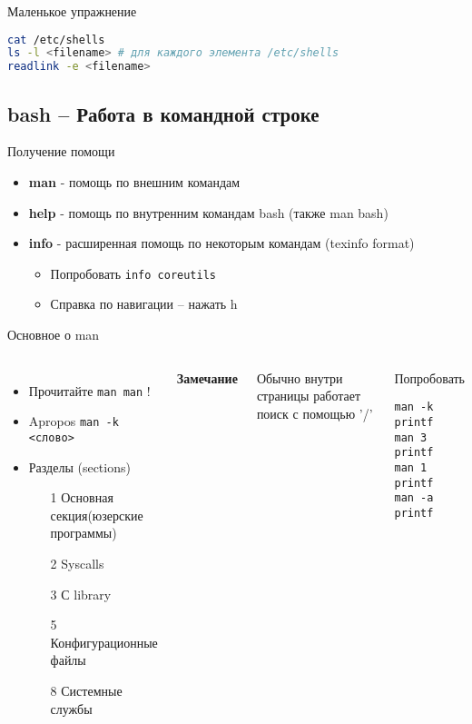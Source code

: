 \documentclass[ignorenonframetext, professionalfonts, hyperref={unicode}]{beamer}
\begin{document}
\begin{frame}[fragile]{Маленькое упражнение}
\begin{lstlisting}[language=bash]
cat /etc/shells
ls -l <filename> # для каждого элемента /etc/shells
readlink -e <filename> 
\end{lstlisting}
\end{frame}
\subsection{bash -- Работа в командной строке}
\begin{frame}[fragile]{Получение помощи}
  \begin{itemize}
    \pause
    \item \textbf{man} - помощь по внешним командам
    \pause
    \item \textbf{help} - помощь по внутренним командам bash (также man bash)
    \pause
    \item \textbf{info} - расширенная помощь по некоторым командам (texinfo format)
      \begin{itemize}
       \item   Попробовать {\tt info coreutils}
       \item   Справка по навигации -- нажать h
      \end{itemize}
  \end{itemize}
\end{frame}
\begin{frame}[fragile]{Основное о man}
\begin{columns}
  \column{2.2in}
  \begin{itemize}
        \item Прочитайте {\tt man man} !
        \item Apropos {\tt man -k <слово>}
        \item Разделы (sections)
          \begin{itemize}
            \item[1] Основная секция(юзерские программы) 
            \item[2] Syscalls
            \item[3] С library
            \item[5] Конфигурационные файлы
            \item[8] Системные службы
          \end{itemize}
  \end{itemize}
  \textbf{Замечание}

  Обычно внутри страницы работает поиск с помощью '/'
 \pause 
 \column{1in}
 \begin{block}{Попробовать}
\begin{lstlisting}
man -k printf
man 3 printf
man 1 printf
man -a printf
\end{lstlisting}
\end{block}
\end{columns}
\end{frame}
\end{document}

